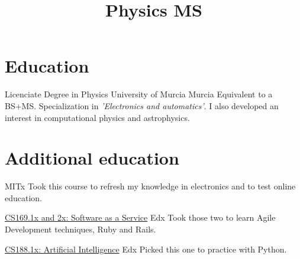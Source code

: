 \documentclass[11pt,a4paper,roman]{moderncv}
\title{Physics MS}
\begin{document}
\maketitle


\section{Education}

{Licenciate Degree in Physics}
{University of Murcia}
{Murcia}{}
{Equivalent to a BS+MS. Specialization in \textit{'Electronics and automatics'}. I also developed an interest in computational physics and astrophysics.}


\section{Additional education}

{MITx}{}{}
{Took this course to refresh my knowledge in electronics and to test online education.} %

{\href{https://www.edx.org/courses/BerkeleyX/CS169.1x/2013_Spring/about}{CS169.1x and 2x: Software as a Service}}
{Edx}{}{}
{Took those two to learn Agile Development techniques, Ruby and Rails.} 

{\href{https://6002x.mitx.mit.edu/}{CS188.1x: Artificial Intelligence}}
{Edx}{}{}
{Picked this one to practice with Python.} 
\end{document}
